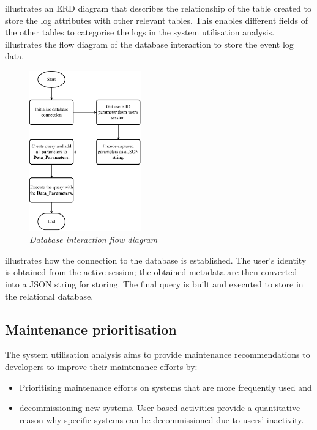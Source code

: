  illustrates an ERD diagram that describes the relationship of the table created to store the log attributes with other relevant tables. This enables different fields of the other tables to categorise the logs in the system utilisation analysis.  illustrates the flow diagram of the database interaction to store the event log data.

\begin{figure}[!htb]
	\centering
	\includegraphics[width=0.43\textwidth]{img/Chapter2/sql_interaction/sql_interaction.pdf}
	\caption[Database interaction flow diagram]
	{\textit{Database interaction flow diagram}}\label{fig:ch2_database}
\end{figure}

 illustrates how the connection to the database is established. The user's identity is obtained from the active session; the obtained metadata are then converted into a JSON string for storing. The final query is built and executed to store in the relational database.

\subsection{Maintenance prioritisation}
The system utilisation analysis aims to provide maintenance recommendations to developers to improve their maintenance efforts by:

\begin{itemize}
	\item Prioritising maintenance efforts on systems that are more frequently used and
	\item decommissioning new systems. User-based activities provide a quantitative reason why specific systems can be decommissioned due to users' inactivity.
\end{itemize}

